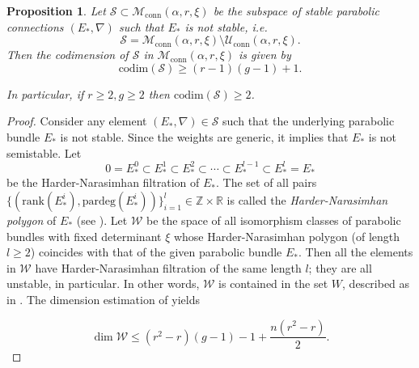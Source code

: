 \documentclass[11pt, reqno]{amsart}
\numberwithin{equation}{section}
\newtheorem{prop}[theorem]{Proposition}
\theoremstyle{definition}
\begin{document}
       \begin{prop}\label{codim}
       Let $\mathcal{S} \subset \mathcal{M}_{\mathrm{conn}}(\alpha, r ,\xi)$ be the subspace of stable parabolic connections $(E_*,\nabla)$ such that $E_*$ is not stable, i.e.
  \[
  \mathcal{S} = \mathcal{M}_{\mathrm{conn}}(\alpha, r ,\xi) \setminus \mathcal{U}_{\mathrm{conn}}(\alpha, r ,\xi).
  \]
  Then the codimension of $\mathcal{S}$ in $\mathcal{M}_{\mathrm{conn}}(\alpha, r ,\xi)$ is given by
           \[
           \mathrm{codim}(\mathcal{S}) \geq (r-1)(g-1)+1.
           \]
           
           In particular, if $r\geq 2, g\geq 2$ then $\mathrm{codim}(\mathcal{S}) \geq 2$.
       \end{prop}
       \begin{proof}
        Consider any element $(E_*,\nabla) \in \mathcal{S}$ such that the underlying parabolic bundle $E_*$ is not stable. Since the weights are generic, it implies that $E_*$ is not semistable. Let 
           \[
           0 = E_*^0 \subset E_*^1 \subset E_*^2 \subset \cdots \subset E_*^{l-1} \subset E_*^l = E_*
           \]
           be the Harder-Narasimhan filtration of $E_*$. The set of all pairs $\{(\mathrm{rank}(E_*^i),\mathrm{pardeg}(E_*^i))\}_{i=1}^l \in \mathbb{Z} \times \mathbb{R}$ is called the \textit{Harder-Narasimhan polygon} of $E_*$ (see \cite[P. $173$]{S77}). Let $\mathcal{W}$ be the space of all isomorphism classes of parabolic bundles with fixed determinant $\xi$ whose  Harder-Narasimhan polygon (of length $l \ge 2$) coincides with that of the given parabolic bundle $E_*$. Then all the elements in $\mathcal{W}$ have Harder-Narasimhan filtration of the same length $l$; they are all unstable, in particular. In other words, $\mathcal{W}$ is contained in the set $W$, described as in . The dimension estimation of  yields  
          
\[
\dim \mathcal{W} \leq (r^2-r)(g-1)-1+\frac{n(r^2-r)}{2}.
\]


\end{proof}
\end{document}
